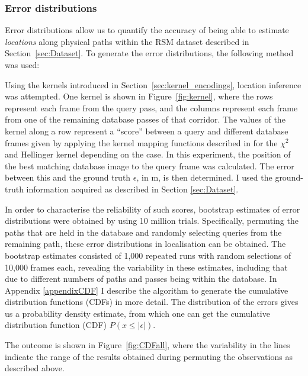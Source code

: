 \subsubsection{Error distributions}
\label{sec:CDFs}
Error distributions allow us to quantify the accuracy of being able to estimate {\em locations} along physical paths within the RSM dataset described in Section~\ref{sec:Dataset}. To generate the error distributions, the following method was used: 

Using the kernels introduced in Section~\ref{sec:kernel_encodings}, location inference was attempted. One kernel is shown in Figure~\ref{fig:kernel}, where the rows represent each frame from the query pass, and the columns represent each frame from one of the remaining database passes of that corridor. The values of the kernel along a row represent a ``score'' between a query and different database frames given by applying the kernel mapping functions described in \citep{Vedaldi2012} for the $\chi^2$ and Hellinger kernel depending on the case. In this experiment, the position of the best matching database image to the query frame was calculated. The error between this and the ground truth $\epsilon$, in m, is then determined. I used the ground-truth information acquired as described in Section \ref{sec:Dataset}. 

In order to characterise the reliability of such scores, bootstrap estimates of error distributions were obtained by using 10 million trials. Specifically, permuting the paths that are held in the database and randomly selecting queries from the remaining path, these error distributions in localisation can be obtained. The bootstrap estimates consisted of 1,000 repeated runs with random selections of 10,000 frames each, revealing the variability in these estimates, including that due to different numbers of paths and passes being within the database. In Appendix \ref{appendixCDF} I describe the algorithm to generate the cumulative distribution functions (CDFs) in more detail. The distribution of the errors gives us a probability density estimate, from which one can get the cumulative distribution function (CDF) $P(x \leq |\epsilon|)$. 

The outcome is shown in Figure~\ref{fig:CDFall}, where the variability in the lines indicate the range of the results obtained during permuting the observations as described above.

